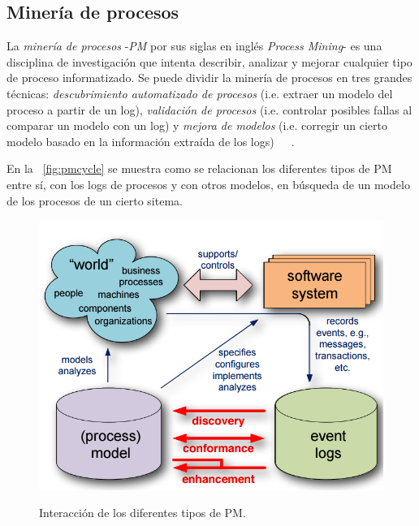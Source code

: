 
\subsection{Minería de procesos} 
\label{sec:2.process mining subsection}

La \textit{minería de procesos} -\textit{PM} por sus siglas en inglés \textit{Process Mining}-
es una disciplina de investigación que intenta describir, analizar y mejorar cualquier
tipo de proceso informatizado. Se puede dividir la minería de procesos en tres grandes técnicas: \textit{descubrimiento automatizado
de procesos} (i.e. extraer un modelo del proceso a partir de un log), \textit{validación de procesos} (i.e. controlar posibles fallas 
al comparar un modelo con un log) y \textit{mejora de modelos} (i.e. corregir un cierto modelo basado en la información extraída de los logs)~\cite{Aalst2004}~\cite{AalstBook}~\cite{FahlandA15}.

En la ~\autoref{fig:pmcycle} se muestra como se relacionan los diferentes tipos de PM entre sí, con los logs de procesos
y con otros modelos, en búsqueda de un modelo de los procesos de un cierto sitema.

\begin{figure}[t]
  	\centering
    \includegraphics[scale=0.5]{img/pmcycle.png}\\
    \caption{Interacción de los diferentes tipos de PM.}
    \label{fig:pmcycle}
\end{figure}

